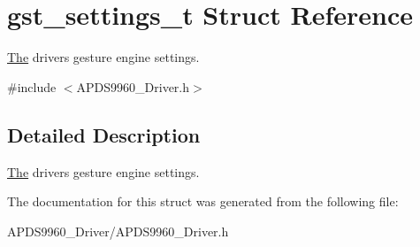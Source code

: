 \hypertarget{structgst__settings__t}{}\section{gst\+\_\+settings\+\_\+t Struct Reference}
\label{structgst__settings__t}


\hyperlink{structThe}{The} driver\textquotesingle{}s gesture engine settings.  




{\ttfamily \#include $<$A\+P\+D\+S9960\+\_\+\+Driver.\+h$>$}



\subsection{Detailed Description}
\hyperlink{structThe}{The} driver\textquotesingle{}s gesture engine settings. 

The documentation for this struct was generated from the following file\+:\begin{DoxyCompactItemize}
\item 
A\+P\+D\+S9960\+\_\+\+Driver/A\+P\+D\+S9960\+\_\+\+Driver.\+h\end{DoxyCompactItemize}
